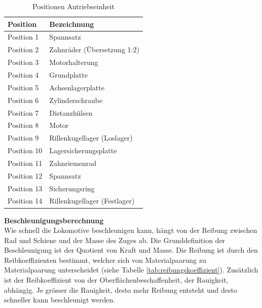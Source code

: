 \documentclass[../../main.tex]{subfiles}
\begin{document}
    \begin{table}[H] \centering
        \begin{tabular}{|l|l|}
        \hline
        \textbf{Position} & \textbf{Bezeichnung}\\
        \hline
        Position 1          & Spannsatz\\
         \hline
        Position 2          & Zahnräder (Übersetzung 1:2)\\
        \hline
        Position 3          & Motorhalterung\\
        \hline
        Position 4          & Grundplatte\\
        \hline
        Position 5          & Achsenlagerplatte\\
        \hline
        Position 6          & Zylinderschraube\\
        \hline
        Position 7          & Distanzhülsen\\
        \hline
        Position 8          & Motor\\
        \hline
        Position 9          & Rillenkugellager (Loslager)\\
        \hline
        Position 10         & Lagersicherungsplatte\\
        \hline
        Position 11         & Zahnriemenrad\\
        \hline
        Position 12         & Spannsatz\\
        \hline
        Position 13         & Sicherungsring\\
        \hline
        Position 14         & Rillenkugellager (Festlager)\\
        \hline
        \end{tabular}

        \caption{Positionen Antriebseinheit}
        \label{tab:pos_antriebseinheit}
        \end{table}

    \pagebreak

    \textbf{Beschleunigungsberechnung}\\
    Wie schnell die Lokomotive beschleunigen kann, hängt von der Reibung zwischen Rad und Schiene und der Masse des Zuges ab. Die Grunddefinition der Beschleunigung ist der Quotient von Kraft und Masse. Die Reibung ist durch den Reibkoeffizienten bestimmt, welcher sich von Materialpaarung zu Materialpaarung unterscheidet (siehe Tabelle \ref{tab:reibungskoeffizient}). Zusätzlich ist der Reibkoeffizient von der Oberflächenbeschaffenheit, der Rauigkeit, abhängig. Je grösser die Rauigkeit, desto mehr Reibung entsteht und desto schneller kann beschleunigt werden.\\
\end{document}
